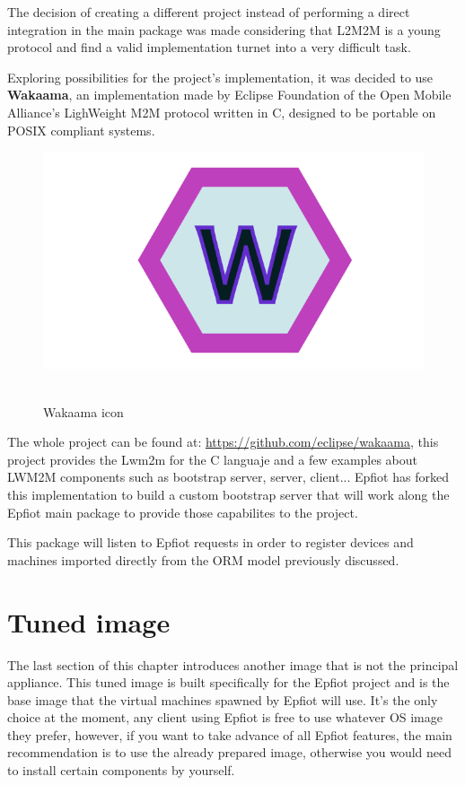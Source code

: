 The decision of creating a different project instead of performing a direct integration in the main package was made considering that L2M2M is a young protocol and find a valid implementation turnet into a very difficult task.
\newpage

Exploring possibilities for the project's implementation, it was decided to use \textbf{Wakaama}, an implementation made by Eclipse Foundation of the Open Mobile Alliance's LighWeight M2M protocol written in C, designed to be portable on POSIX compliant systems.

\begin{figure}[h]%
\centering
    \includegraphics[width=4.5in]{figures/Wakaama.png}
~\caption{Wakaama icon}
\label{figure3.6}
\end{figure}

The whole project can be found at: \url{https://github.com/eclipse/wakaama}, this project provides the Lwm2m for the C languaje and a few examples about LWM2M components such as bootstrap server, server, client... Epfiot has forked this implementation to build a custom bootstrap server that will work along the Epfiot main package to provide those capabilites to the project.

This package will listen to Epfiot requests in order to register devices and machines imported directly from the ORM model previously discussed.


\newpage
\section{Tuned image}
\label{makereference3.3}

The last section of this chapter introduces another image that is not the principal appliance. This tuned image is built specifically for the Epfiot project and is the base image that the virtual machines spawned by Epfiot will use. It's the only choice at the moment, any client using Epfiot is free to use whatever OS image they prefer, however, if you want to take advance of all Epfiot features, the main recommendation is to use the already prepared image, otherwise you would need to install certain components by yourself.

